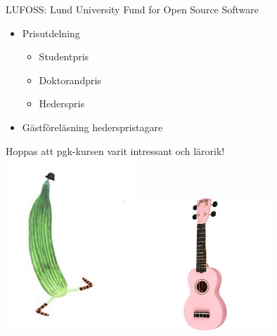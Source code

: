 \begin{Slide}{LUFOSS: Lund University Fund for Open Source Software}
\begin{itemize}
  \item Prisutdelning
  \begin{itemize}
    \item Studentpris
    \item Doktorandpris
    \item Hederspris
  \end{itemize}
  \item Gästföreläsning hederspristagare
\end{itemize}
\end{Slide}



\begin{Slide}{Hoppas att pgk-kursen varit intressant och lärorik!}
\pause\includegraphics[width=5cm]{../img/gurka.jpg}\includegraphics[width=5cm]{../img/ukulele.jpg}
\end{Slide}

